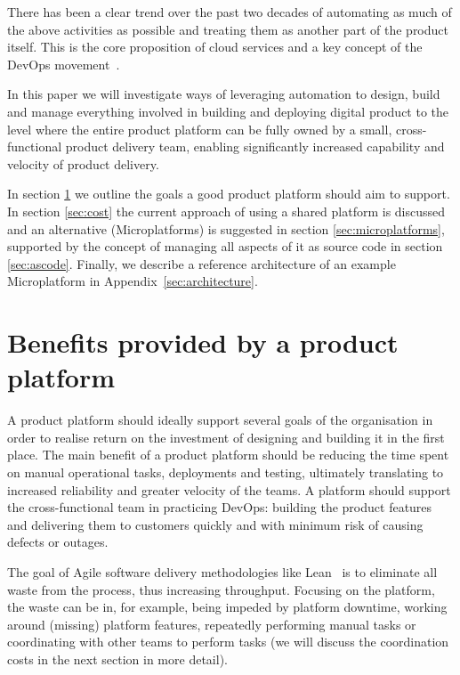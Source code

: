 \documentclass[reprint,amsmath,amssymb,aps]{revtex4-1}
\begin{document}
There has been a clear trend over the past two decades of automating as much of the above activities as possible and treating them as another part of the product itself. This is the core proposition of cloud services and a key concept of the DevOps movement~\cite{DevOpsCu34:online}.

In this paper we will investigate ways of leveraging automation to design, build and manage everything involved in building and deploying digital product to the level where the entire product platform can be fully owned by a small, cross-functional product delivery team, enabling significantly increased capability and velocity of product delivery.

In section \ref{sec:benefits} we outline the goals a good product platform should aim to support. In section \ref{sec:cost} the current approach of using a shared platform is discussed and an alternative (Microplatforms) is suggested in section \ref{sec:microplatforms}, supported by the concept of managing all aspects of it as source code in section \ref{sec:ascode}. Finally, we describe a reference architecture of an example Microplatform in Appendix~\ref{sec:architecture}.


\section{Benefits provided by a product platform}
\label{sec:benefits}

A product platform should ideally support several goals of the organisation in order to realise return on the investment of designing and building it in the first place. The main benefit of a product platform should be reducing the time spent on manual operational tasks, deployments and testing, ultimately translating to increased reliability and greater velocity of the teams. A platform should support the cross-functional team in practicing DevOps: building the product features and delivering them to customers quickly and with minimum risk of causing defects or outages.

The goal of Agile software delivery methodologies like Lean~\cite{LeanSoft20:online} is to eliminate all waste from the process, thus increasing throughput. Focusing on the platform, the waste can be in, for example, being impeded by platform downtime, working around (missing) platform features, repeatedly performing manual tasks or coordinating with other teams to perform tasks (we will discuss the coordination costs in the next section in more detail).
\end{document}
